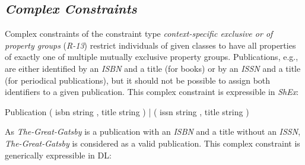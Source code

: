 \documentclass[a4paper,fontsize=11pt]{scrartcl}
\newcommand{\ms}[1]{\texttt{#1}}
\begin{document}
\subsection{\emph{Complex Constraints}}

Complex constraints of the constraint type \emph{context-specific exclusive or of property groups} (\emph{R-13}) restrict individuals of given classes to have all properties of exactly one of multiple mutually exclusive property groups. Publications, e.g., are either identified by an \emph{ISBN} and a title (for books) or by an \emph{ISSN} and a title (for periodical publications), but it should not be possible to assign both identifiers to a given publication. This complex constraint is expressible in \emph{ShEx}: 

\begin{ex}
Publication { 
    ( isbn string , title string ) |
    ( issn string , title string ) }
\end{ex}

As \emph{The-Great-Gatsby} is a publication with an \emph{ISBN} and a title without an \emph{ISSN}, \emph{The-Great-Gatsby} is considered as a valid publication. This complex constraint is generically expressible in DL:





\end{document}
